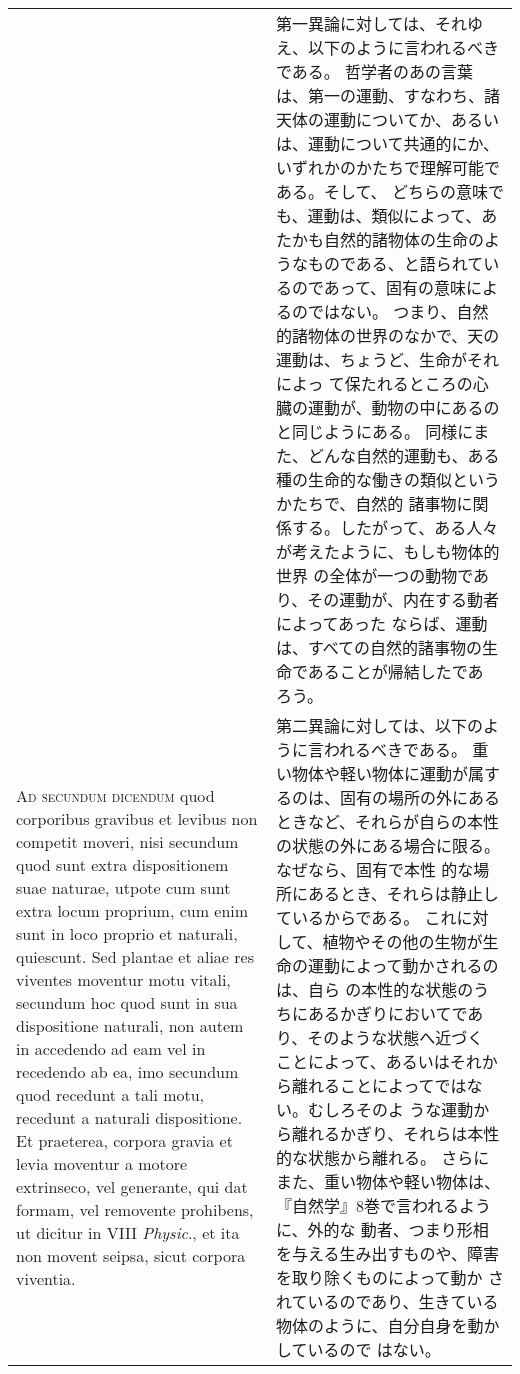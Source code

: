 \documentclass[10pt]{jsarticle} %
\begin{document}
\begin{longtable}{p{21em}p{21em}}
&

第一異論に対しては、それゆえ、以下のように言われるべきである。
哲学者のあの言葉は、第一の運動、すなわち、諸天体の運動についてか、あるい
 は、運動について共通的にか、いずれかのかたちで理解可能である。そして、
 どちらの意味でも、運動は、類似によって、あたかも自然的諸物体の生命のよ
 うなものである、と語られているのであって、固有の意味によるのではない。
つまり、自然的諸物体の世界のなかで、天の運動は、ちょうど、生命がそれによっ
 て保たれるところの心臓の運動が、動物の中にあるのと同じようにある。
同様にまた、どんな自然的運動も、ある種の生命的な働きの類似というかたちで、自然的
 諸事物に関係する。したがって、ある人々が考えたように、もしも物体的世界
 の全体が一つの動物であり、その運動が、内在する動者によってあった
 ならば、運動は、すべての自然的諸事物の生命であることが帰結したであ
 ろう。


\\



{\scshape Ad secundum dicendum} quod corporibus gravibus et levibus non
 competit moveri, nisi secundum quod sunt extra dispositionem suae
 naturae, utpote cum sunt extra locum proprium, cum enim sunt in loco
 proprio et naturali, quiescunt. Sed plantae et aliae res viventes
 moventur motu vitali, secundum hoc quod sunt in sua dispositione
 naturali, non autem in accedendo ad eam vel in recedendo ab ea, imo
 secundum quod recedunt a tali motu, recedunt a naturali
 dispositione. Et praeterea, corpora gravia et levia moventur a motore
 extrinseco, vel generante, qui dat formam, vel removente prohibens, ut
 dicitur in VIII {\itshape Physic}., et ita non movent seipsa, sicut corpora
 viventia.
 
&

第二異論に対しては、以下のように言われるべきである。
重い物体や軽い物体に運動が属するのは、固有の場所の外にあるときなど、それらが自らの本性
 の状態の外にある場合に限る。なぜなら、固有で本性
 的な場所にあるとき、それらは静止しているからである。
これに対して、植物やその他の生物が生命の運動によって動かされるのは、自ら
 の本性的な状態のうちにあるかぎりにおいてであり、そのような状態へ近づく
 ことによって、あるいはそれから離れることによってではない。むしろそのよ
 うな運動から離れるかぎり、それらは本性的な状態から離れる。
さらにまた、重い物体や軽い物体は、『自然学』8巻で言われるように、外的な
 動者、つまり形相を与える生み出すものや、障害を取り除くものによって動か
 されているのであり、生きている物体のように、自分自身を動かしているので
 はない。
 

\\




\end{longtable}
\end{document}
